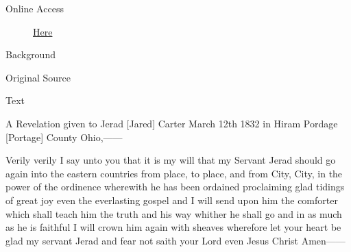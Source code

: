 			\begin{description}
				\item[Online Access] \href{https://www.josephsmithpapers.org/paper-summary/revelation-12-march-1832-dc-79/1}{Here}
			\end{description}
			
			\begin{description}
				\item[Background]
			\end{description}
			
			
			\begin{description}
				\item[Original Source]
			\end{description}
			
			
			\begin{description}
				\item[Text]
			\end{description}
			
				A Revelation given to Jerad [Jared] Carter March 12th 1832 in Hiram Pordage [Portage] County Ohio,------
				
				Verily verily I say unto you that it is my will that my Servant Jerad should go again into the eastern countries from place, to place, and from City, City, in the power of the ordinence wherewith he has been ordained proclaiming glad tidings of great joy even the everlasting gospel and I will send upon him the comforter which shall teach him the truth and his way whither he shall go and in as much as he is faithful I will crown him again with sheaves wherefore let your heart be glad my servant Jerad and fear not saith your Lord even Jesus Christ Amen------
				
